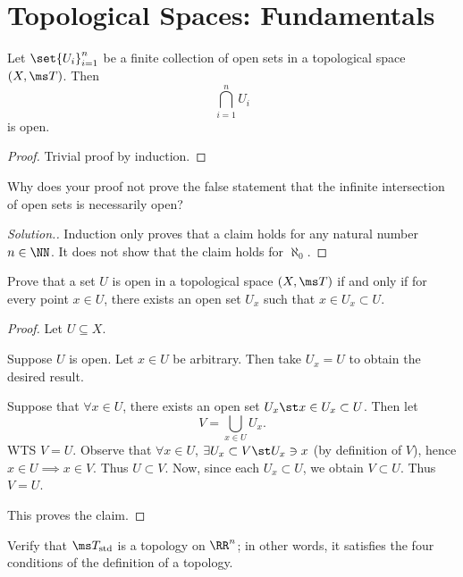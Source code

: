 \chapter{Topological Spaces: Fundamentals}
\begin{problem}[3.1]
  Let $\set{U_i}_{i=1}^n$ be a finite collection of open sets in a topological
  space $(X, \ms T)$. Then
  \[
    \bigcap_{i=1}^n U_i
  \]
  is open.
\end{problem}
\begin{proof}
  Trivial proof by induction.
\end{proof}
\begin{problem}[3.2]
  Why does your proof not prove the false statement that the infinite
  intersection of open sets is necessarily open?
\end{problem}
\begin{proof}[Solution.]
  Induction only proves that a claim holds for any natural number $n \in \NN$.
  It does not show that the claim holds for $\aleph_0$.
\end{proof}
\begin{problem}[3.3]
  Prove that a set $U$ is open in a topological space $(X, \ms T)$ if and only
  if for every point $x \in U$, there exists an open set $U_x$ such that $x \in
  U_x \subset U$.
\end{problem}
\begin{proof}
  Let $U \subseteq X$.
  \begin{iffproof}
    \item Suppose $U$ is open. Let $x \in U$ be arbitrary. Then take $U_x = U$
      to obtain the desired result.
    \item Suppose that $\forall x \in U$, there exists an open set $U_x \st x
      \in U_x \subset U$. Then let
      \[
        V = \bigcup_{x \in U} U_x.
      \]
      WTS $V = U$. Observe that $\forall x \in U$, $\exists U_x \subset V \st
      U_x \ni x$ (by definition of $V$), hence $x \in U \implies x \in V$. Thus
      $U \subset V$. Now, since each $U_x \subset U$, we obtain $V \subset U$.
      Thus $V = U$.
    \end{iffproof}
    This proves the claim.
\end{proof}
\begin{problem}[3.4]
  Verify that $\ms T_{\rm std}$ is a topology on $\RR^n$; in other words, it
  satisfies the four conditions of the definition of a topology.
\end{problem}
